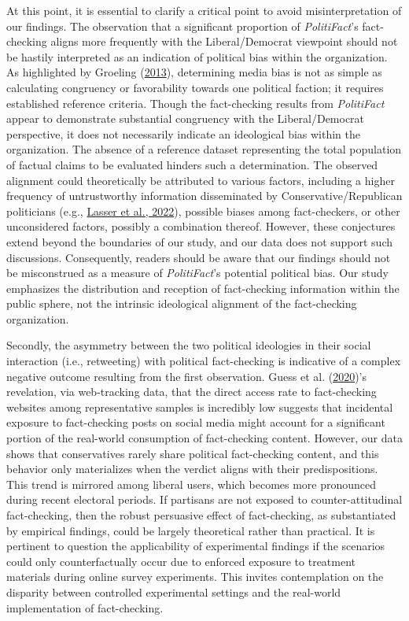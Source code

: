 \documentclass[
  12pt,
]{article}
\begin{document}
At this point, it is essential to clarify a critical point to avoid
misinterpretation of our findings. The observation that a significant
proportion of \emph{PolitiFact}'s fact-checking aligns more frequently
with the Liberal/Democrat viewpoint should not be hastily interpreted as
an indication of political bias within the organization. As highlighted
by Groeling (\protect\hyperlink{ref-groeling2013media}{2013}),
determining media bias is not as simple as calculating congruency or
favorability towards one political faction; it requires established
reference criteria. Though the fact-checking results from
\emph{PolitiFact} appear to demonstrate substantial congruency with the
Liberal/Democrat perspective, it does not necessarily indicate an
ideological bias within the organization. The absence of a reference
dataset representing the total population of factual claims to be
evaluated hinders such a determination. The observed alignment could
theoretically be attributed to various factors, including a higher
frequency of untrustworthy information disseminated by
Conservative/Republican politicians (e.g.,
\protect\hyperlink{ref-lasser2022social}{Lasser et al., 2022}), possible
biases among fact-checkers, or other unconsidered factors, possibly a
combination thereof. However, these conjectures extend beyond the
boundaries of our study, and our data does not support such discussions.
Consequently, readers should be aware that our findings should not be
misconstrued as a measure of \emph{PolitiFact}'s potential political
bias. Our study emphasizes the distribution and reception of
fact-checking information within the public sphere, not the intrinsic
ideological alignment of the fact-checking organization.

Secondly, the asymmetry between the two political ideologies in their
social interaction (i.e., retweeting) with political fact-checking is
indicative of a complex negative outcome resulting from the first
observation. Guess et al.
(\protect\hyperlink{ref-guess2020exposure}{2020})'s revelation, via
web-tracking data, that the direct access rate to fact-checking websites
among representative samples is incredibly low suggests that incidental
exposure to fact-checking posts on social media might account for a
significant portion of the real-world consumption of fact-checking
content. However, our data shows that conservatives rarely share
political fact-checking content, and this behavior only materializes
when the verdict aligns with their predispositions. This trend is
mirrored among liberal users, which becomes more pronounced during
recent electoral periods. If partisans are not exposed to
counter-attitudinal fact-checking, then the robust persuasive effect of
fact-checking, as substantiated by empirical findings, could be largely
theoretical rather than practical. It is pertinent to question the
applicability of experimental findings if the scenarios could only
counterfactually occur due to enforced exposure to treatment materials
during online survey experiments. This invites contemplation on the
disparity between controlled experimental settings and the real-world
implementation of fact-checking.
\end{document}

